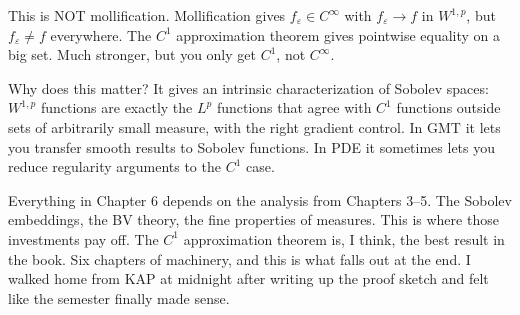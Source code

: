 \begin{remark}\label{rmk:not-mollification}
This is NOT mollification. Mollification gives $f_\varepsilon \in C^\infty$ with $f_\varepsilon \to f$ in $W^{1,p}$, but $f_\varepsilon \neq f$ everywhere. The $C^1$ approximation theorem gives pointwise equality on a big set. Much stronger, but you only get $C^1$, not $C^\infty$.
\end{remark}

Why does this matter? It gives an intrinsic characterization of Sobolev spaces: $W^{1,p}$ functions are exactly the $L^p$ functions that agree with $C^1$ functions outside sets of arbitrarily small measure, with the right gradient control. In GMT it lets you transfer smooth results to Sobolev functions. In PDE it sometimes lets you reduce regularity arguments to the $C^1$ case.

Everything in Chapter 6 depends on the analysis from Chapters 3--5. The Sobolev embeddings, the BV theory, the fine properties of measures. This is where those investments pay off. The $C^1$ approximation theorem is, I think, the best result in the book. Six chapters of machinery, and this is what falls out at the end. I walked home from KAP at midnight after writing up the proof sketch and felt like the semester finally made sense.
